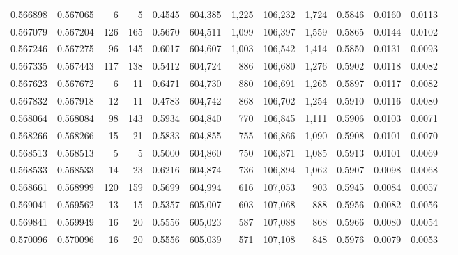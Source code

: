 \begin{tabular}{rrrrrrrrrrrrr}
0.566898 & 0.567065 &     6 &     5 &                                     0.4545 & 604,385 &   1,225 & 106,232 &   1,724 & 0.5846 & 0.0160 & 0.0113 \\
0.567079 & 0.567204 &   126 &   165 &                                     0.5670 & 604,511 &   1,099 & 106,397 &   1,559 & 0.5865 & 0.0144 & 0.0102 \\
0.567246 & 0.567275 &    96 &   145 &                                     0.6017 & 604,607 &   1,003 & 106,542 &   1,414 & 0.5850 & 0.0131 & 0.0093 \\
0.567335 & 0.567443 &   117 &   138 &                                     0.5412 & 604,724 &     886 & 106,680 &   1,276 & 0.5902 & 0.0118 & 0.0082 \\
0.567623 & 0.567672 &     6 &    11 &                                     0.6471 & 604,730 &     880 & 106,691 &   1,265 & 0.5897 & 0.0117 & 0.0082 \\
0.567832 & 0.567918 &    12 &    11 &                                     0.4783 & 604,742 &     868 & 106,702 &   1,254 & 0.5910 & 0.0116 & 0.0080 \\
0.568064 & 0.568084 &    98 &   143 &                                     0.5934 & 604,840 &     770 & 106,845 &   1,111 & 0.5906 & 0.0103 & 0.0071 \\
0.568266 & 0.568266 &    15 &    21 &                                     0.5833 & 604,855 &     755 & 106,866 &   1,090 & 0.5908 & 0.0101 & 0.0070 \\
0.568513 & 0.568513 &     5 &     5 &                                     0.5000 & 604,860 &     750 & 106,871 &   1,085 & 0.5913 & 0.0101 & 0.0069 \\
0.568533 & 0.568533 &    14 &    23 &                                     0.6216 & 604,874 &     736 & 106,894 &   1,062 & 0.5907 & 0.0098 & 0.0068 \\
0.568661 & 0.568999 &   120 &   159 &                                     0.5699 & 604,994 &     616 & 107,053 &     903 & 0.5945 & 0.0084 & 0.0057 \\
0.569041 & 0.569562 &    13 &    15 &                                     0.5357 & 605,007 &     603 & 107,068 &     888 & 0.5956 & 0.0082 & 0.0056 \\
0.569841 & 0.569949 &    16 &    20 &                                     0.5556 & 605,023 &     587 & 107,088 &     868 & 0.5966 & 0.0080 & 0.0054 \\
0.570096 & 0.570096 &    16 &    20 &                                     0.5556 & 605,039 &     571 & 107,108 &     848 & 0.5976 & 0.0079 & 0.0053 \\

\end{tabular}
